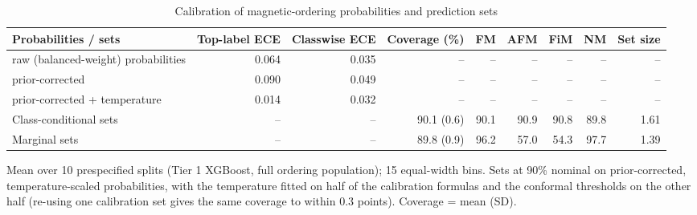\begin{table}
\caption{Calibration of magnetic-ordering probabilities and prediction sets}
\label{tab:table5_ordering_calibration}
\tablefont
\begin{tabularx}{\textwidth}{@{}>{\raggedright\arraybackslash}Xrrrrrrrr@{}}
\toprule
\textbf{Probabilities / sets} & \textbf{Top-label ECE} & \textbf{Classwise ECE} & \textbf{Coverage (\%)} & \textbf{FM} & \textbf{AFM} & \textbf{FiM} & \textbf{NM} & \textbf{Set size} \\
\midrule
raw (balanced-weight) probabilities & 0.064 & 0.035 & -- & -- & -- & -- & -- & -- \\
prior-corrected & 0.090 & 0.049 & -- & -- & -- & -- & -- & -- \\
prior-corrected + temperature & 0.014 & 0.032 & -- & -- & -- & -- & -- & -- \\
Class-conditional sets & -- & -- & 90.1 (0.6) & 90.1 & 90.9 & 90.8 & 89.8 & 1.61 \\
Marginal sets & -- & -- & 89.8 (0.9) & 96.2 & 57.0 & 54.3 & 97.7 & 1.39 \\
\bottomrule
\end{tabularx}
\par\vspace{4pt}\raggedright\noindent Mean over 10 prespecified splits (Tier 1 XGBoost, full ordering population); 15 equal-width bins. Sets at 90\% nominal on prior-corrected, temperature-scaled probabilities, with the temperature fitted on half of the calibration formulas and the conformal thresholds on the other half (re-using one calibration set gives the same coverage to within 0.3 points). Coverage = mean (SD).
\end{table}
